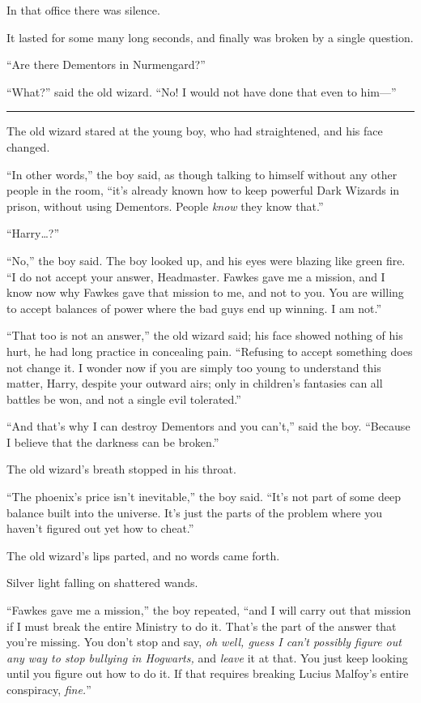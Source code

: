 In that office there was silence.

It lasted for some many long seconds, and finally was broken by a single
question.

``Are there Dementors in Nurmengard?''

``What?'' said the old wizard. ``No! I would not have done that even to
him---''

\begin{center}\rule{3in}{0.4pt}\end{center}

The old wizard stared at the young boy, who had straightened, and his
face changed.

``In other words,'' the boy said, as though talking to himself without
any other people in the room, ``it's already known how to keep powerful
Dark Wizards in prison, without using Dementors. People \emph{know} they
know that.''

``Harry\ldots{}?''

``No,'' the boy said. The boy looked up, and his eyes were blazing like
green fire. ``I do not accept your answer, Headmaster. Fawkes gave me a
mission, and I know now why Fawkes gave that mission to me, and not to
you. You are willing to accept balances of power where the bad guys end
up winning. I am not.''

``That too is not an answer,'' the old wizard said; his face showed
nothing of his hurt, he had long practice in concealing pain. ``Refusing
to accept something does not change it. I wonder now if you are simply
too young to understand this matter, Harry, despite your outward airs;
only in children's fantasies can all battles be won, and not a single
evil tolerated.''

``And that's why I can destroy Dementors and you can't,'' said the boy.
``Because I believe that the darkness can be broken.''

The old wizard's breath stopped in his throat.

``The phoenix's price isn't inevitable,'' the boy said. ``It's not part
of some deep balance built into the universe. It's just the parts of the
problem where you haven't figured out yet how to cheat.''

The old wizard's lips parted, and no words came forth.

Silver light falling on shattered wands.

``Fawkes gave me a mission,'' the boy repeated, ``and I will carry out
that mission if I must break the entire Ministry to do it. That's the
part of the answer that you're missing. You don't stop and say, \emph{oh
well, guess I can't possibly figure out any way to stop bullying in
Hogwarts,} and \emph{leave} it at that. You just keep looking until you
figure out how to do it. If that requires breaking Lucius Malfoy's
entire conspiracy, \emph{fine.}''

